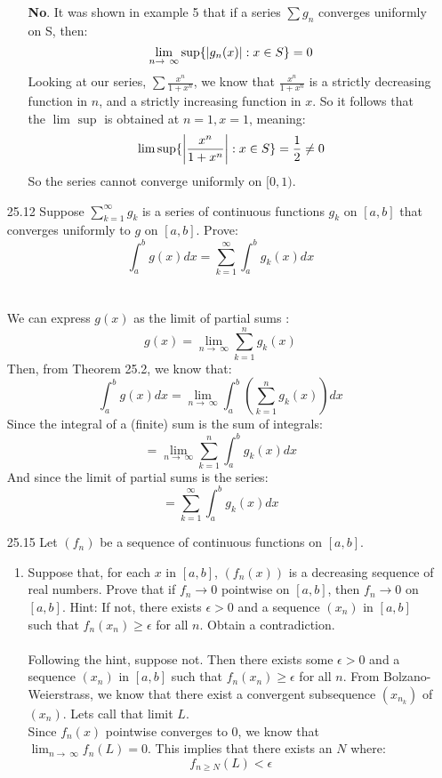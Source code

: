 \begin{enumerate}
\begin{enumerate}
        \textbf{No}. It was shown in example 5 that if a series $\sum g_n$ converges uniformly on S, then:
        $$\lim_{n \to\ \infty} \sup \{ \left\vert g_n(x) \right\vert : x \in S \} = 0$$
        Looking at our series, $\sum \frac{x^n}{1 + x^n}$, we know that $\frac{x^n}{1 + x^n}$ is a strictly decreasing function in $n$, and a strictly increasing function in $x$. So it follows that the $\lim_{} \sup$ is obtained at $n=1, x=1$, meaning:
        $$\lim_{} \sup \{ \left\vert \frac{x^n}{1 + x^n} \right\vert : x \in S \} = \frac{1}{2} \neq 0$$
        So the series cannot converge uniformly on $[0,1)$.
    \end{enumerate}
  \item [25.12]
    Suppose $\sum_{k=1}^\infty g_k$ is a series of continuous functions $g_k$ on $[a,b]$ that converges uniformly to $g$ on $[a,b]$. Prove:
    $$\int_{a}^b g(x) dx = \sum_{k=1}^\infty \int_a^b g_k(x) dx$$\\\\

    We can express $g(x)$ as the limit of partial sums : 
    $$g(x) = \lim_{n \to\ \infty} \sum_{k=1}^n g_k(x)$$
    Then, from Theorem 25.2, we know that:
    $$\int_a^b g(x) dx = \lim_{n \to\ \infty} \int_a^b (\sum_{k=1}^n g_k(x)) dx$$
    Since the integral of a (finite) sum is the sum of integrals:
    $$= \lim_{n \to\ \infty} \sum_{k=1}^n \int_a^b g_k(x) dx$$
    And since the limit of partial sums is the series:
    $$=\sum_{k=1}^\infty \int_a^b g_k(x) dx$$
  \item [25.15]
    Let $(f_n)$ be a sequence of continuous functions on $[a,b]$.
    \begin{enumerate}
      \item Suppose that, for each $x$ in $[a,b]$, $(f_n(x))$ is a decreasing sequence of real numbers. Prove that if $f_n \rightarrow 0$ pointwise on $[a,b]$, then $f_n \rightarrow 0$ on $[a,b]$. Hint: If not, there exists $\epsilon > 0$ and a sequence $(x_n)$ in $[a,b]$ such that $f_n(x_n) \geq \epsilon$ for all $n$. Obtain a contradiction.\\\\

        Following the hint, suppose not. Then there exists some $\epsilon > 0$ and a sequence $(x_n)$ in $[a,b]$ such that $f_n(x_n) \geq \epsilon$ for all $n$. From Bolzano-Weierstrass, we know that there exist a convergent subsequence $(x_{n_k})$ of $(x_n)$. Lets call that limit $L$.\\

        Since $f_n(x)$ pointwise converges to $0$, we know that $\lim_{n \to\ \infty} f_n(L) = 0$. This implies that there exists an $N$ where:
        $$f_{n \geq N}(L) < \epsilon$$


\end{enumerate}
\end{enumerate}
